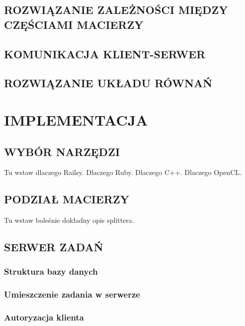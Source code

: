 \documentclass[12pt,a4paper,twoside]{article}
\begin{document}
\subsection{ROZWIĄZANIE ZALEŻNOŚCI MIĘDZY CZĘŚCIAMI MACIERZY}
\label{sec:dependencies}

\subsection{KOMUNIKACJA KLIENT-SERWER}
\label{sec:communication}

\subsection{ROZWIĄZANIE UKŁADU RÓWNAŃ}
\label{sec:solution}

\section{IMPLEMENTACJA}

\subsection{WYBÓR NARZĘDZI}
\label{sec:tools}

Tu wstaw dlaczego Railsy. Dlaczego Ruby. Dlaczego C++. Dlaczego OpenCL.

\subsection{PODZIAŁ MACIERZY}

Tu wstaw boleśnie dokładny opis splittera.


\subsection{SERWER ZADAŃ}

\subsubsection{Struktura bazy danych}

\subsubsection{Umieszczenie zadania w serwerze}

\subsubsection{Autoryzacja klienta}
\end{document}
